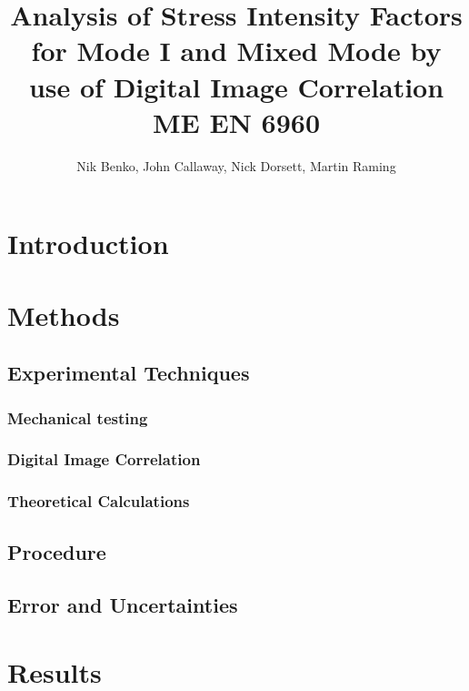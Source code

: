 \documentclass[12pt]{article}
\begin{document}
\title{ Analysis of Stress Intensity Factors for Mode I and Mixed Mode by use of  Digital Image Correlation \\ \normalsize{ME EN 6960}}
\author{Nik Benko, John Callaway, Nick Dorsett, Martin Raming}
\maketitle

\begin{abstract} 
\end{abstract}

\section{Introduction} %

\section{Methods}

\subsection{Experimental Techniques} 
\subsubsection{Mechanical testing} %
\subsubsection{Digital Image Correlation} %
\subsubsection{Theoretical Calculations} %



\subsection{Procedure} %

\subsection{Error and Uncertainties} %

\section{Results}%
\end{document}

